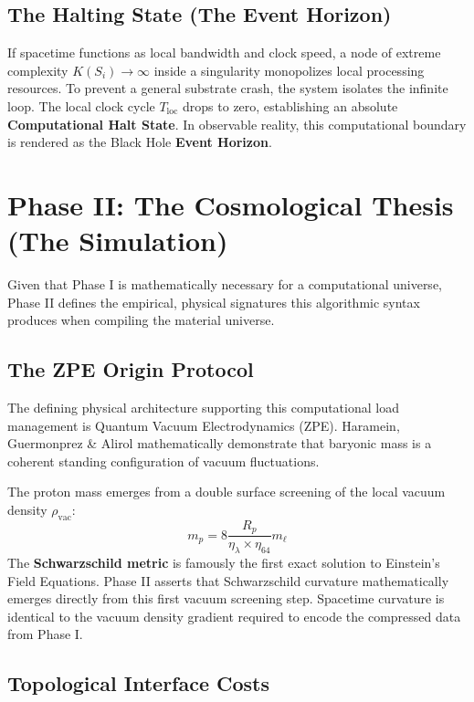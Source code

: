 \documentclass[12pt, a4paper]{article}
\theoremstyle{plain}
\theoremstyle{definition}
\begin{document}
\subsection{The Halting State (The Event Horizon)}

If spacetime functions as local bandwidth and clock speed, a node of extreme complexity $K(S_i) \to \infty$ inside a singularity monopolizes local processing resources. To prevent a general substrate crash, the system isolates the infinite loop. The local clock cycle $T_{\text{loc}}$ drops to zero, establishing an absolute \textbf{Computational Halt State}. In observable reality, this computational boundary is rendered as the Black Hole \textbf{Event Horizon}.

\section{Phase II: The Cosmological Thesis (The Simulation)}

Given that Phase I is mathematically necessary for a computational universe, Phase II defines the empirical, physical signatures this algorithmic syntax produces when compiling the material universe.

\subsection{The ZPE Origin Protocol}

The defining physical architecture supporting this computational load management is Quantum Vacuum Electrodynamics (ZPE). Haramein, Guermonprez \& Alirol \citep{Haramein2023} mathematically demonstrate that baryonic mass is a coherent standing configuration of vacuum fluctuations.

The proton mass emerges from a double surface screening of the local vacuum density $\rho_{\text{vac}}$:
\begin{equation}
m_p = 8 \frac{R_p}{\eta_\lambda \times \eta_{64}} m_\ell
\end{equation}
The \textbf{Schwarzschild metric} is famously the first exact solution to Einstein's Field Equations. Phase II asserts that Schwarzschild curvature mathematically emerges directly from this first vacuum screening step. Spacetime curvature is identical to the vacuum density gradient required to encode the compressed data from Phase I.

\subsection{Topological Interface Costs}
\end{document}
